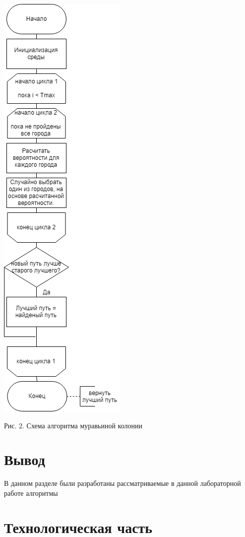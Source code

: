 \documentclass[12pt]{report}
\begin{document}
\begin{center}
		\includegraphics[scale=0.7]{ant.png}
		
		Рис. 2. Схема алгоритма муравьиной колонии
	\end{center}

	\chapter*{Вывод}
	
	В данном разделе были разработаны рассматриваемые в данной лабораторной работе алгоритмы

	\chapter{Технологическая часть}
\end{document}
